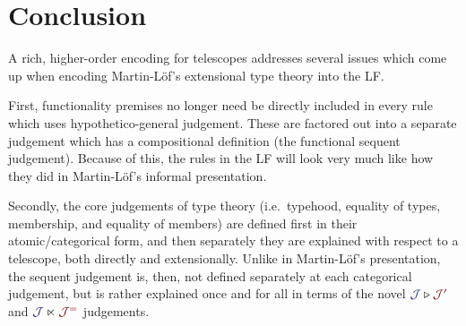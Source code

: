 \documentclass[acmtoplas]{acmtrans2m}
\def\InputModeColorName{MidnightBlue}
\def\OutputModeColorName{Maroon}
\newcommand\InputMode[1]{{\color{\InputModeColorName}{#1}}}
\newcommand\OutputMode[1]{{\color{\OutputModeColorName}{#1}}}
\newcommand\sploot[2]{\InputMode{#1}\triangleright\OutputMode{#2}}
\newcommand\refract[2]{\InputMode{#1}\ltimes\OutputMode{#2}}
\newcommand\dname[1]{\mathcal{#1}}
\begin{document}
\section{Conclusion}

A rich, higher-order encoding for telescopes addresses several issues
which come up when encoding Martin-L\"of's extensional type theory
into the LF.

First, functionality premises no longer need be directly included in
every rule which uses hypothetico-general judgement. These are
factored out into a separate judgement which has a compositional
definition (the functional sequent judgement). Because of this, the
rules in the LF will look very much like how they did in
Martin-L\"of's informal presentation.

Secondly, the core judgements of type theory (i.e.\ typehood, equality
of types, membership, and equality of members) are defined first in
their atomic/categorical form, and then separately they are explained
with respect to a telescope, both directly and extensionally. Unlike
in Martin-L\"of's presentation, the sequent judgement is, then, not
defined separately at each categorical judgement, but is rather
explained once and for all in terms of the novel
$\sploot{\dname{J}}{\dname{J}'}$ and
$\refract{\dname{J}}{\dname{J}^=}$ judgements.

\bigskip


\nocite{*}

\end{document}

